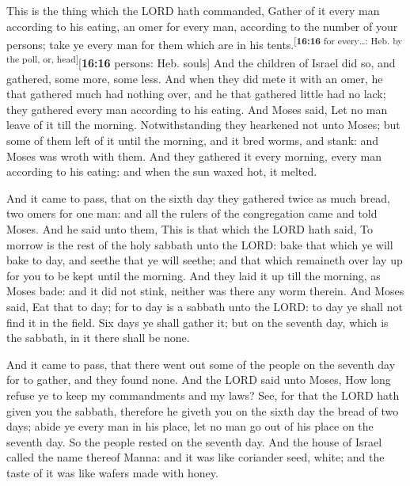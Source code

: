  This is the thing which the LORD hath commanded, Gather
of it every man according to his eating, an omer for every man,
according to the number of your persons; take ye every man for them
which are in his tents.\textsuperscript{{[}\textbf{16:16} for
every\ldots: Heb. by the poll, or, head{]}}{[}\textbf{16:16} persons:
Heb. souls{]}  And the children of Israel did so, and
gathered, some more, some less.  And when they did mete
it with an omer, he that gathered much had nothing over, and he that
gathered little had no lack; they gathered every man according to his
eating.  And Moses said, Let no man leave of it till the
morning.  Notwithstanding they hearkened not unto Moses;
but some of them left of it until the morning, and it bred worms, and
stank: and Moses was wroth with them.  And they gathered
it every morning, every man according to his eating: and when the sun
waxed hot, it melted.

 And it came to pass, that on the sixth day they gathered
twice as much bread, two omers for one man: and all the rulers of the
congregation came and told Moses.  And he said unto them,
This is that which the LORD hath said, To morrow is the rest of the holy
sabbath unto the LORD: bake that which ye will bake to day, and seethe
that ye will seethe; and that which remaineth over lay up for you to be
kept until the morning.  And they laid it up till the
morning, as Moses bade: and it did not stink, neither was there any worm
therein.  And Moses said, Eat that to day; for to day is
a sabbath unto the LORD: to day ye shall not find it in the field.
 Six days ye shall gather it; but on the seventh day,
which is the sabbath, in it there shall be none.

 And it came to pass, that there went out some of the
people on the seventh day for to gather, and they found none.
 And the LORD said unto Moses, How long refuse ye to keep
my commandments and my laws?  See, for that the LORD hath
given you the sabbath, therefore he giveth you on the sixth day the
bread of two days; abide ye every man in his place, let no man go out of
his place on the seventh day.  So the people rested on
the seventh day.  And the house of Israel called the name
thereof Manna: and it was like coriander seed, white; and the taste of
it was like wafers made with honey.

